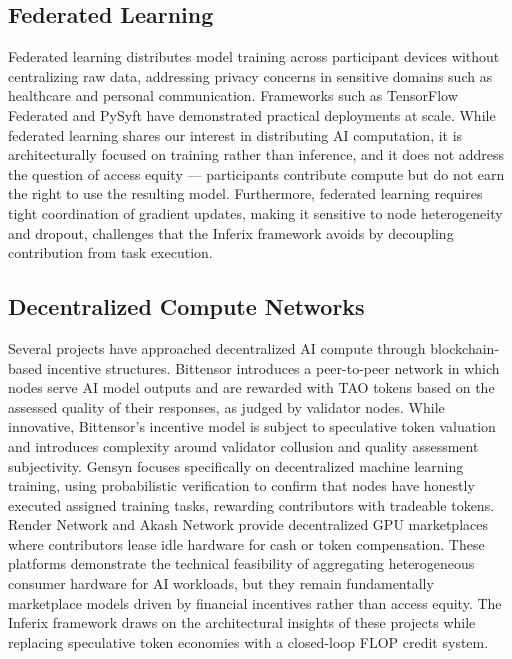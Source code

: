 \documentclass[12pt]{article}
\begin{document}
\subsection{Federated Learning}

Federated learning \cite{mcmahan2017federated} distributes model training across participant devices without centralizing raw data, addressing privacy concerns in sensitive domains such as healthcare and personal communication. Frameworks such as TensorFlow Federated \cite{tff2019} and PySyft \cite{pysyft2018} have demonstrated practical deployments at scale. While federated learning shares our interest in distributing AI computation, it is architecturally focused on training rather than inference, and it does not address the question of access equity — participants contribute compute but do not earn the right to use the resulting model. Furthermore, federated learning requires tight coordination of gradient updates, making it sensitive to node heterogeneity and dropout, challenges that the Inferix framework avoids by decoupling contribution from task execution.

\subsection{Decentralized Compute Networks}

Several projects have approached decentralized AI compute through blockchain-based incentive structures. Bittensor \cite{bittensor2022} introduces a peer-to-peer network in which nodes serve AI model outputs and are rewarded with TAO tokens based on the assessed quality of their responses, as judged by validator nodes. While innovative, Bittensor's incentive model is subject to speculative token valuation and introduces complexity around validator collusion and quality assessment subjectivity. Gensyn \cite{gensyn2022} focuses specifically on decentralized machine learning training, using probabilistic verification to confirm that nodes have honestly executed assigned training tasks, rewarding contributors with tradeable tokens. Render Network \cite{rendernetwork2020} and Akash Network \cite{akash2020} provide decentralized GPU marketplaces where contributors lease idle hardware for cash or token compensation. These platforms demonstrate the technical feasibility of aggregating heterogeneous consumer hardware for AI workloads, but they remain fundamentally marketplace models driven by financial incentives rather than access equity. The Inferix framework draws on the architectural insights of these projects while replacing speculative token economies with a closed-loop FLOP credit system.
\end{document}
